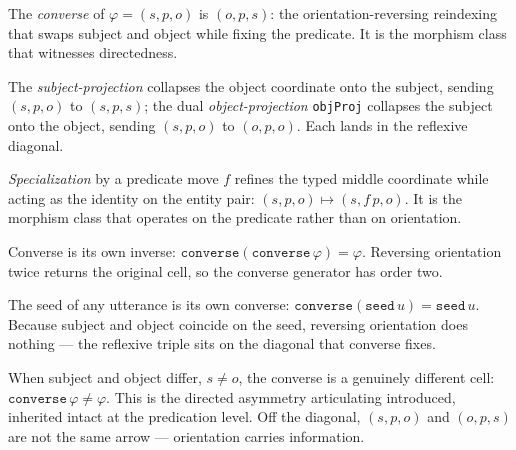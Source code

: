 \begin{definition}[Converse]\label{def:predication-converse}\leanok{}
The \emph{converse} of $\varphi = (s, p, o)$ is $(o, p, s)$: the orientation-reversing reindexing that swaps subject and object while fixing the predicate. It is the morphism class that witnesses directedness.
\end{definition}

\begin{definition}[Projections]\label{def:predication-proj}\leanok{}
The \emph{subject-projection} collapses the object coordinate onto the subject, sending $(s, p, o)$ to $(s, p, s)$; the dual \emph{object-projection} \texttt{objProj} collapses the subject onto the object, sending $(s, p, o)$ to $(o, p, o)$. Each lands in the reflexive diagonal.
\end{definition}

\begin{definition}[Specialization]\label{def:predication-specialize}\leanok{}
\emph{Specialization} by a predicate move $f$ refines the typed middle coordinate while acting as the identity on the entity pair: $(s, p, o) \mapsto (s, f\,p, o)$. It is the morphism class that operates on the predicate rather than on orientation.
\end{definition}

\begin{theorem}\leanok{}
Converse is its own inverse: $\texttt{converse}(\texttt{converse}\,\varphi) = \varphi$. Reversing orientation twice returns the original cell, so the converse generator has order two.
\end{theorem}

\begin{theorem}\leanok{}
The seed of any utterance is its own converse: $\texttt{converse}(\texttt{seed}\,u) = \texttt{seed}\,u$. Because subject and object coincide on the seed, reversing orientation does nothing --- the reflexive triple sits on the diagonal that converse fixes.
\end{theorem}

\begin{theorem}\leanok{}
When subject and object differ, $s \neq o$, the converse is a genuinely different cell: $\texttt{converse}\,\varphi \neq \varphi$. This is the directed asymmetry articulating introduced, inherited intact at the predication level. Off the diagonal, $(s,p,o)$ and $(o,p,s)$ are not the same arrow --- orientation carries information.
\end{theorem}

